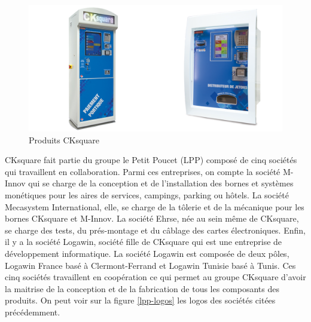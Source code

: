 \documentclass[a4paper]{article}
\begin{document}
\begin{figure}[h!]
  \begin{center}
  \includegraphics[scale=0.2]{./img/bornes.png}
  \caption{Produits CKsquare}
    \label{bornes-intro}
  \end{center}
\end{figure}

CKsquare fait partie du groupe le Petit Poucet (LPP) composé de cinq sociétés
qui travaillent en collaboration. Parmi ces entreprises, on compte la société
M-Innov qui se charge de la conception et de l'installation des bornes et
systèmes monétiques pour les aires de services, campings, parking ou hôtels. La
société Mecasystem International, elle, se charge de la tôlerie et de la
mécanique pour les bornes CKsquare et M-Innov. La société Ehrse, née au sein
même de CKsquare, se charge des tests, du prés-montage et du câblage des cartes
électroniques. Enfin, il y a la société Logawin, société fille de CKsquare qui
est une entreprise de développement informatique. La société Logawin est
composée de deux pôles, Logawin France basé à Clermont-Ferrand et Logawin
Tunisie basé à Tunis. Ces cinq sociétés travaillent en coopération ce qui permet
au groupe CKsquare d'avoir la maitrise de la conception et de la fabrication de
tous les composants des produits. On peut voir sur la figure \ref{lpp-logos} les
logos des sociétés citées précédemment.

\clearpage
\end{document}
